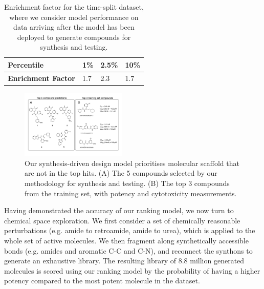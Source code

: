 \begin{table}
\centering
\begin{tabular}{|l|l|l|l|}
\hline
\textbf{Percentile}        & 1\% & 2.5\% & 10\% \\ \hline
\textbf{Enrichment Factor} & 1.7 & 2.3   & 1.7  \\ \hline
\end{tabular}
\caption{Enrichment factor for the time-split dataset, where we consider model performance on data arriving after the model has been deployed to generate compounds for synthesis and testing. }
\label{table:time_split}
\end{table}

\begin{figure}
\centering
         \includegraphics[width=0.45\textwidth]{Chapters/Ranking/Figs/fig2.pdf}
    \caption{Our synthesis-driven design model prioritises molecular scaffold that are not in the top hits. (A) The 5 compounds selected by our methodology for synthesis and testing. (B) The top 3 compounds from the training set, with potency and cytotoxicity measurements. }
    \label{fig:compounds}
\end{figure}


Having demonstrated the accuracy of our ranking model, we now turn to chemical space exploration. We first consider a set of chemically reasonable perturbations (e.g. amide to retroamide, amide to urea), which is applied to the whole set of active molecules. We then fragment along synthetically accessible bonds (e.g. amides and aromatic C-C and C-N), and reconnect the synthons to generate an exhaustive library. The resulting library of 8.8 million generated molecules is scored using our ranking model by the probability of having a higher potency compared to the most potent molecule in the dataset.  %


